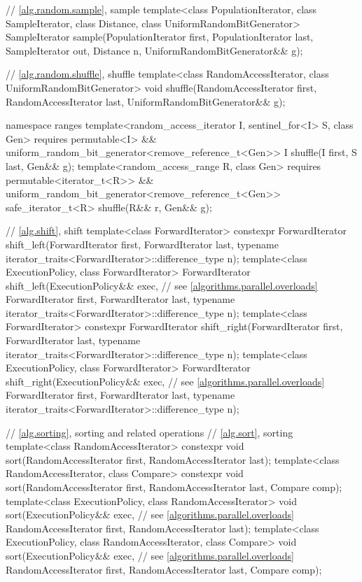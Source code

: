 \begin{codeblock}
{  // \ref{alg.random.sample}, sample
  template<class PopulationIterator, class SampleIterator,
           class Distance, class UniformRandomBitGenerator>
    SampleIterator sample(PopulationIterator first, PopulationIterator last,
                          SampleIterator out, Distance n,
                          UniformRandomBitGenerator&& g);

  // \ref{alg.random.shuffle}, shuffle
  template<class RandomAccessIterator, class UniformRandomBitGenerator>
    void shuffle(RandomAccessIterator first,
                 RandomAccessIterator last,
                 UniformRandomBitGenerator&& g);

  namespace ranges {
    template<random_access_iterator I, sentinel_for<I> S, class Gen>
      requires permutable<I> &&
               uniform_random_bit_generator<remove_reference_t<Gen>>
      I shuffle(I first, S last, Gen&& g);
    template<random_access_range R, class Gen>
      requires permutable<iterator_t<R>> &&
               uniform_random_bit_generator<remove_reference_t<Gen>>
      safe_iterator_t<R> shuffle(R&& r, Gen&& g);
  }

  // \ref{alg.shift}, shift
  template<class ForwardIterator>
    constexpr ForwardIterator
      shift_left(ForwardIterator first, ForwardIterator last,
                 typename iterator_traits<ForwardIterator>::difference_type n);
  template<class ExecutionPolicy, class ForwardIterator>
    ForwardIterator
      shift_left(ExecutionPolicy&& exec,                        // see \ref{algorithms.parallel.overloads}
                 ForwardIterator first, ForwardIterator last,
                 typename iterator_traits<ForwardIterator>::difference_type n);
  template<class ForwardIterator>
    constexpr ForwardIterator
      shift_right(ForwardIterator first, ForwardIterator last,
                  typename iterator_traits<ForwardIterator>::difference_type n);
  template<class ExecutionPolicy, class ForwardIterator>
    ForwardIterator
      shift_right(ExecutionPolicy&& exec,                       // see \ref{algorithms.parallel.overloads}
                  ForwardIterator first, ForwardIterator last,
                  typename iterator_traits<ForwardIterator>::difference_type n);

  // \ref{alg.sorting}, sorting and related operations
  // \ref{alg.sort}, sorting
  template<class RandomAccessIterator>
    constexpr void sort(RandomAccessIterator first, RandomAccessIterator last);
  template<class RandomAccessIterator, class Compare>
    constexpr void sort(RandomAccessIterator first, RandomAccessIterator last,
                        Compare comp);
  template<class ExecutionPolicy, class RandomAccessIterator>
    void sort(ExecutionPolicy&& exec,                           // see \ref{algorithms.parallel.overloads}
              RandomAccessIterator first, RandomAccessIterator last);
  template<class ExecutionPolicy, class RandomAccessIterator, class Compare>
    void sort(ExecutionPolicy&& exec,                           // see \ref{algorithms.parallel.overloads}
              RandomAccessIterator first, RandomAccessIterator last,
              Compare comp);

}
\end{codeblock}
